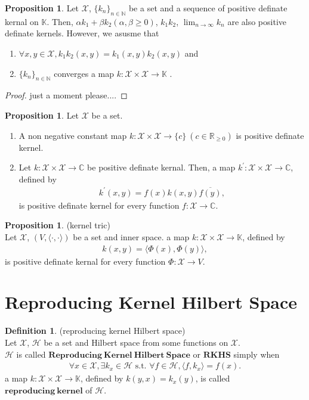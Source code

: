 \documentclass[11pt, a4paper, english, dvipdfmx]{jsarticle}
\theoremstyle{definition}
\newtheorem{Definition+}[Axiom+]{Definition}
\newtheorem{Proposition+}[Axiom+]{Proposition}
\def\hoge<#1>{\langle #1 \rangle}
\newcommand{\N}{\mathbb{N}}
\newcommand{\R}{\mathbb{R}}
\newcommand{\C}{\mathbb{C}}
\newcommand{\K}{\mathbb{K}}
\newcommand{\X}{\mathcal{X}}
\newcommand{\Hil}{\mathcal{H}}
\newcommand{\dip}{\displaystyle}
\begin{document}
\begin{Proposition+}
    Let $\X$, $\{k_{n}\}_{n\in\N}$ be a set and a sequence of positive definate kernal on $\K$.
    Then, $\alpha k_{1} + \beta k_{2}(\alpha, \beta \geq 0)$, $k_{1}k_{2}$, $\dip \lim_{n\to\infty}k_{n}$ are also positive definate kernels.
    However, we asusme that 
    \begin{enumerate}
        \item $\forall x, y\in\X, k_{1}k_{2}(x, y) = k_{1}(x, y)k_{2}(x, y)$ and
        \item $\{k_{n}\}_{n\in\N}$ converges a map $k:\X\times\X\to\K$ .
    \end{enumerate}
    \begin{proof}
        just a moment please....
    \end{proof}
\end{Proposition+}

\begin{Proposition+}
    Let $\X$ be a set.
    \begin{enumerate}
        \item A non negative constant map $k:\X\times\X\to\{c\}~(c\in\R_{\geq 0})$ is positive definate kernel.
        \item Let $k:\X\times\X\to\C$ be positive definate kernal. Then, a map $k^{'}:\X\times\X\to\C$, defined by 
        \begin{align*}
            k^{'}(x, y) = f(x)k(x, y)\overline{f(y)},
        \end{align*} 
        is positive definate kernel for every function $f:\X\to\C$.
    \end{enumerate}
\end{Proposition+}

\begin{Proposition+}(kernel tric)\\
    Let $\X$, $(V, \hoge<\cdot, \cdot>)$ be a set and inner space. a map $k:\X\times\X\to\K$, defined by 
    \begin{align*}
        k(x, y) = \hoge<\Phi(x), \Phi(y)>,
    \end{align*}
    is positive definate kernal for every function $\Phi:\X\to V$.
\end{Proposition+}
\section{Reproducing Kernel Hilbert Space}
\begin{Definition+}(reproducing kernel Hilbert space)\\
    Let $\X$, $\Hil$ be a set and Hilbert space from some functions on $\X$.\\
    $\Hil$ is called $\mathbf{Reproducing~Kernel~Hilbert~Space}$ or $\mathbf{RKHS}$ simply when
    \begin{align*}
        \forall x\in\X, \exists k_{x}\in\Hil\text{ s.t. }\forall f\in\Hil, \hoge<f, k_{x}> = f(x).
    \end{align*} 
    a map $k:\X\times\X\to\K$, defined by $k(y, x) = k_{x}(y)$, is called $\mathbf{reproducing~kernel}$ of $\Hil$. 
\end{Definition+}
\end{document}
